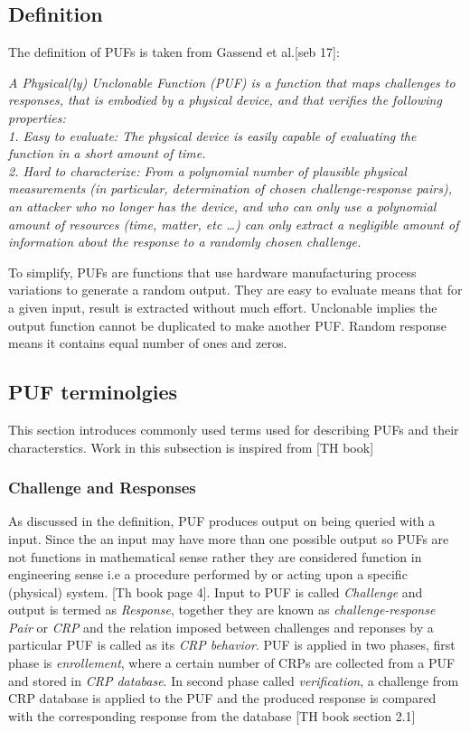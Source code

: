 \subsection{Definition}
The definition of PUFs is taken from Gassend et al.[seb 17]:

\emph{A Physical(ly) Unclonable Function (PUF) is a function that maps challenges to responses, that is embodied by a physical device, and that verifies the following properties:\\
1. Easy to evaluate: The physical device is easily capable of evaluating the function in a short amount of time.\\
2. Hard to characterize: From a polynomial number of plausible physical measurements (in particular, determination of chosen challenge-response pairs), an attacker who no longer has the device, and who can only use a polynomial amount of resources (time, matter, etc \ldots) can only extract a negligible amount of information about the response to a randomly chosen challenge.\\}

To simplify, PUFs are functions that use hardware manufacturing process variations to generate a random output. They are easy to evaluate means that for a given input, result is extracted without much effort. Unclonable implies the output function cannot be duplicated to make another PUF. Random response means it contains equal number of ones and zeros.

\subsection{PUF terminolgies}
This section introduces commonly used terms used for describing PUFs and their characterstics. Work in this subsection is inspired from [TH book]

\subsubsection{Challenge and Responses}
As discussed in the definition, PUF produces output on being queried with a input. Since the an input may have more than one possible output so PUFs are not functions in mathematical sense rather they are considered function in engineering sense i.e a procedure performed by or acting upon a specific (physical) system. [Th book page 4]. Input to PUF is called \emph{Challenge} and output is termed as \emph{Response}, together they are known as \emph{challenge-response Pair} or \emph{CRP} and the relation imposed between challenges and reponses by a particular PUF is called as its \emph{CRP behavior}. PUF is applied in two phases, first phase is \emph{enrollement}, where a certain number of CRPs are collected from a PUF and stored in \emph{CRP database}. In second phase called \emph{verification}, a challenge from CRP database is applied to the PUF and the produced response is compared with the corresponding response from the database [TH book section 2.1]

